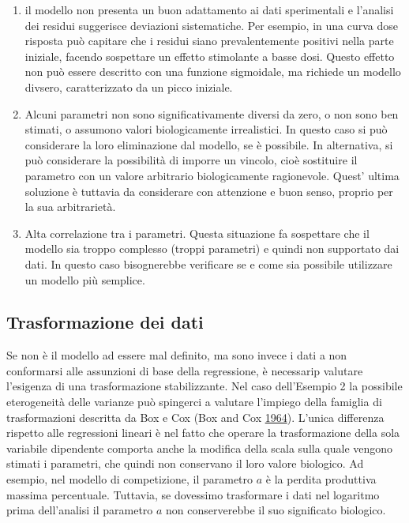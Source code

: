 \documentclass[a4paper,12pt,oneside]{book}
\providecommand{\tightlist}{%
  \setlength{\itemsep}{0pt}\setlength{\parskip}{0pt}}
\theoremstyle{definition}
\theoremstyle{definition}
\theoremstyle{definition}
\theoremstyle{remark}
\begin{document}
\begin{enumerate}
\def\labelenumi{\arabic{enumi}.}
\tightlist
\item
  il modello non presenta un buon adattamento ai dati sperimentali e
  l'analisi dei residui suggerisce deviazioni sistematiche. Per esempio,
  in una curva dose risposta può capitare che i residui siano
  prevalentemente positivi nella parte iniziale, facendo sospettare un
  effetto stimolante a basse dosi. Questo effetto non può essere
  descritto con una funzione sigmoidale, ma richiede un modello divsero,
  caratterizzato da un picco iniziale.
\item
  Alcuni parametri non sono significativamente diversi da zero, o non
  sono ben stimati, o assumono valori biologicamente irrealistici. In
  questo caso si può considerare la loro eliminazione dal modello, se è
  possibile. In alternativa, si può considerare la possibilità di
  imporre un vincolo, cioè sostituire il parametro con un valore
  arbitrario biologicamente ragionevole. Quest' ultima soluzione è
  tuttavia da considerare con attenzione e buon senso, proprio per la
  sua arbitrarietà.
\item
  Alta correlazione tra i parametri. Questa situazione fa sospettare che
  il modello sia troppo complesso (troppi parametri) e quindi non
  supportato dai dati. In questo caso bisognerebbe verificare se e come
  sia possibile utilizzare un modello più semplice.
\end{enumerate}

\subsection{Trasformazione dei dati}\label{trasformazione-dei-dati}

Se non è il modello ad essere mal definito, ma sono invece i dati a non
conformarsi alle assunzioni di base della regressione, è necessarip
valutare l'esigenza di una trasformazione stabilizzante. Nel caso
dell'Esempio 2 la possibile eterogeneità delle varianze può spingerci a
valutare l'impiego della famiglia di trasformazioni descritta da Box e
Cox (Box and Cox
\protect\hyperlink{ref-box1964_analysistransformations}{1964}). L'unica
differenza rispetto alle regressioni lineari è nel fatto che operare la
trasformazione della sola variabile dipendente comporta anche la
modifica della scala sulla quale vengono stimati i parametri, che quindi
non conservano il loro valore biologico. Ad esempio, nel modello di
competizione, il parametro \(a\) è la perdita produttiva massima
percentuale. Tuttavia, se dovessimo trasformare i dati nel logaritmo
prima dell'analisi il parametro \(a\) non conserverebbe il suo
significato biologico.
\end{document}
